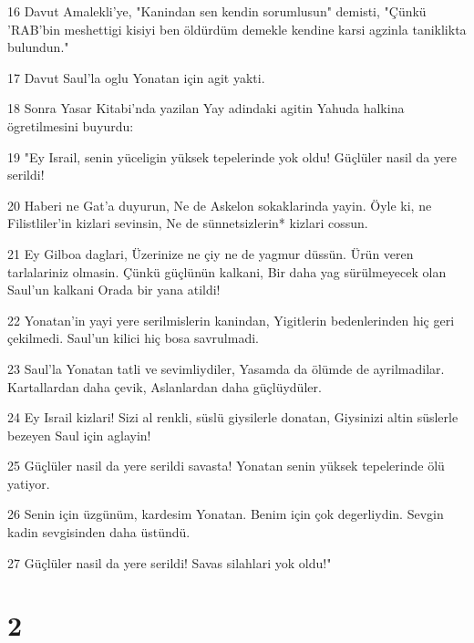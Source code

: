 \par 16 Davut Amalekli'ye, "Kanindan sen kendin sorumlusun" demisti, "Çünkü 'RAB'bin meshettigi kisiyi ben öldürdüm demekle kendine karsi agzinla taniklikta bulundun."
\par 17 Davut Saul'la oglu Yonatan için agit yakti.
\par 18 Sonra Yasar Kitabi'nda yazilan Yay adindaki agitin Yahuda halkina ögretilmesini buyurdu:
\par 19 "Ey Israil, senin yüceligin yüksek tepelerinde yok oldu! Güçlüler nasil da yere serildi!
\par 20 Haberi ne Gat'a duyurun, Ne de Askelon sokaklarinda yayin. Öyle ki, ne Filistliler'in kizlari sevinsin, Ne de sünnetsizlerin* kizlari cossun.
\par 21 Ey Gilboa daglari, Üzerinize ne çiy ne de yagmur düssün. Ürün veren tarlalariniz olmasin. Çünkü güçlünün kalkani, Bir daha yag sürülmeyecek olan Saul'un kalkani Orada bir yana atildi!
\par 22 Yonatan'in yayi yere serilmislerin kanindan, Yigitlerin bedenlerinden hiç geri çekilmedi. Saul'un kilici hiç bosa savrulmadi.
\par 23 Saul'la Yonatan tatli ve sevimliydiler, Yasamda da ölümde de ayrilmadilar. Kartallardan daha çevik, Aslanlardan daha güçlüydüler.
\par 24 Ey Israil kizlari! Sizi al renkli, süslü giysilerle donatan, Giysinizi altin süslerle bezeyen Saul için aglayin!
\par 25 Güçlüler nasil da yere serildi savasta! Yonatan senin yüksek tepelerinde ölü yatiyor.
\par 26 Senin için üzgünüm, kardesim Yonatan. Benim için çok degerliydin. Sevgin kadin sevgisinden daha üstündü.
\par 27 Güçlüler nasil da yere serildi! Savas silahlari yok oldu!"

\chapter{2}

